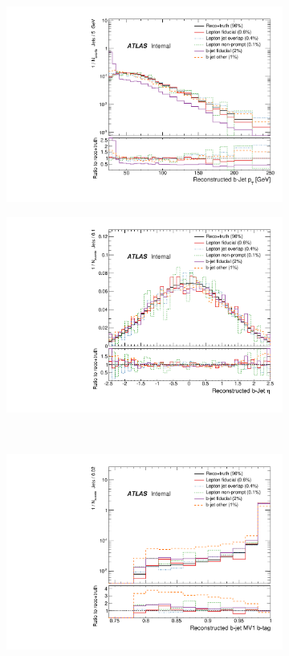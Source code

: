 \begin{figure}
\centering
\begin{subfigure}[]{0.45\textwidth}
\includegraphics[width=\textwidth]{fig/RecoNotTruth/BJetPt.pdf}
\end{subfigure}
\begin{subfigure}[]{0.45\textwidth}
\includegraphics[width=\textwidth]{fig/RecoNotTruth/BJetEta.pdf}
\end{subfigure}
\\
\begin{subfigure}[]{0.45\textwidth}
\includegraphics[width=\textwidth]{fig/RecoNotTruth/BJetMV1.pdf}

\end{subfigure}
\end{figure}
